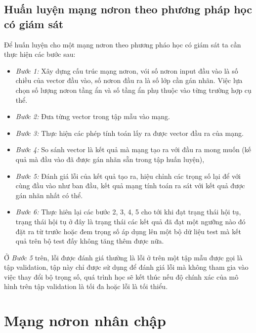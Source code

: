 \documentclass[13pt, a4paper]{extreport}
\begin{document}
\subsection{Huấn luyện mạng nơron theo phương pháp học có giám sát}
\indent Để huấn luyện cho một mạng nơron theo phương pháo học có giám sát ta cần thực hiện các bước sau:\\
\begin{itemize}
\item \textit{Bước 1: }Xây dựng cấu trúc mạng nơron, vói số nơron input đầu vào là số chiều của vector đầu vào, số nơron đầu ra là số lớp cần gán nhãn. Việc lựa chọn số lượng nơron tầng ẩn và số tầng ẩn phụ thuộc vào từng trường hợp cụ thể.
\item \textit{Bước 2: }Đưa từng vector trong tập mẫu vào mạng.
\item \textit{Bước 3: }Thực hiện các phép tính toán lấy ra được vector đầu ra của mạng.
\item \textit{Bước 4: }So sánh vector là kết quả mà mạng tạo ra với đầu ra mong muốn (kế quả mà đầu vào đã được gán nhãn sẵn trong tập huấn luyện), 
\item \textit{Bước 5: }Đánh giá lỗi của kết quả tạo ra, hiệu chỉnh các trọng số lại để với cùng đầu vào như ban đầu, kết quả mạng tính toán ra sát với kết quả được gán nhãn nhất có thể.
\item \textit{Bước 6: }Thực hiên lại các bước 2, 3, 4, 5 cho tới khi đạt trạng thái hội tụ, trạng thái hội tụ ở đây là trạng thái các kết quả đã đạt một ngưỡng nào đó đặt ra từ trước hoặc đem trọng số áp dụng lên một bộ dữ liệu test mà kết quả trên bộ test đấy không tăng thêm được nữa.
\end{itemize}
\indent Ở \textit{Bước 5} trên, lỗi được đánh giá thường là lỗi ở trên một tập mẫu được gọi là tập validation, tập này chỉ được sử dụng để đánh giá lỗi mà không tham gia vào việc thay đổi bộ trọng số, quá trình học sẽ kết thúc nếu độ chính xác của mô hình trên tập validation là tối đa hoặc lỗi là tối thiểu.
\section{Mạng nơron nhân chập}
\end{document}
